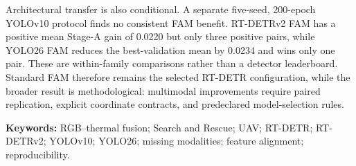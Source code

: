 Architectural transfer is also conditional. A separate five-seed, 200-epoch
YOLOv10 protocol finds no consistent FAM benefit. RT-DETRv2 FAM has a positive
mean Stage-A gain of 0.0220 but only three positive pairs, while YOLO26 FAM
reduces the best-validation mean by 0.0234 and wins only one pair. These are
within-family comparisons rather than a detector leaderboard. Standard FAM
therefore remains the selected RT-DETR configuration, while the broader result
is methodological: multimodal improvements require paired replication,
explicit coordinate contracts, and predeclared model-selection rules.

\vspace{1em}
\noindent\textbf{Keywords:} RGB--thermal fusion; Search and Rescue; UAV;
RT-DETR; RT-DETRv2; YOLOv10; YOLO26; missing modalities; feature alignment;
reproducibility.
